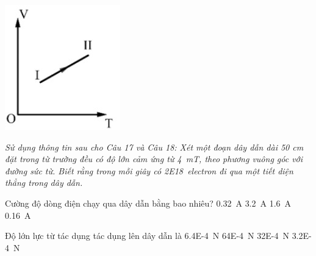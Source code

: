 \begin{ex}
		{\vspace{-0.5cm}\includegraphics[scale=0.8]{../figs/FINAL-SEM1-004-5}}
	\loigiai{}
\end{ex}
\textit{Sử dụng thông tin sau cho Câu 17 và Câu 18: Xét một đoạn dây dẫn dài 50 cm đặt trong từ trường đều có độ lớn cảm ứng từ \SI{4}{\milli\tesla}, theo phương vuông góc với đường sức từ. Biết rằng trong mỗi giây có \SI{2E18}{electron} đi qua một tiết diện thẳng trong dây dẫn.}
\begin{ex}
	Cường độ dòng điện chạy qua dây dẫn bằng bao nhiêu?
	\choice
	{\SI{0.32}{\ampere}}
	{\SI{3.2}{\ampere}}
	{\SI{1.6}{\ampere}}
	{\SI{0.16}{\ampere}}
	\loigiai{}
\end{ex}
\begin{ex}
	Độ lớn lực từ tác dụng tác dụng lên dây dẫn là
	\choice
	{\SI{6.4E-4}{\newton}}
	{\SI{64E-4}{\newton}}
	{\SI{32E-4}{\newton}}
	{\SI{3.2E-4}{\newton}}
	\loigiai{}
\end{ex}
